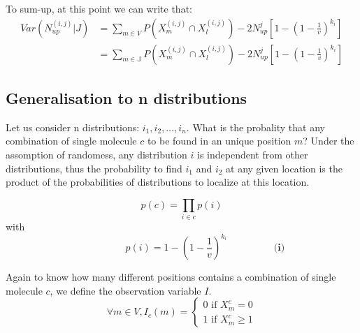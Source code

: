 \documentclass{article}
\begin{document}
To sum-up, at this point we can write that:
\[\begin{split}
    Var(N^{(i,j)}_{up}|J) &= \sum_{m\in V}P(X_m^{(i,j)} \cap X_l^{(i,j)}) - 2N^j_{up}[1-{(1-\frac{1}{v})}^{k_i}] \\
    &=  \sum_{m\in \mathbb{J}}P(X_m^{(i,j)} \cap X_l^{(i,j)}) - 2N^j_{up}[1-{(1-\frac{1}{v})}^{k_i}]
\end{split}
\]


\newpage
\subsection{Generalisation to n distributions}

Let us consider n distributions: $i_1, i_2, \ldots, i_n$. What is the probality that any combination of single molecule $c$ to be found in an unique position $m$?
Under the assomption of randomess, any distribution $i$ is independent from other distributions, thus the probability to find $i_1$ and $i_2$ at any given
location is the product of the probabilities of distributions to localize at this location.

\[
p(c) = \prod_{i \in c}p(i)
\]
with 
\begin{equation}
\hspace{2cm} p(i) = 1-{(1-\frac{1}{v})}^{k_i} \hspace{2cm} \textbf{(i)}
\end{equation}

Again to know how many different positions contains a combination of single molecule $c$, we define the observation variable $I$.
\[
\forall m \in V, I_c(m) = \begin{cases}
    0 \text{ if } X^c_m = 0 \\
    1 \text{ if } X^c_m \geq 1
\end{cases}
\]



\begin{figure}[h]
\centering
\end{figure}
\end{document}
